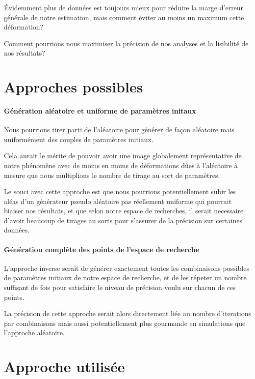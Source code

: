 		Évidemment plus de données est toujours mieux pour réduire la marge d'erreur générale de notre estimation, mais comment éviter au moins un maximum cette déformation?
	
		\begin{problem}
			Comment pourrions nous maximiser la précision de nos analyses et la lisibilité de nos résultats?
		\end{problem}
	
	\section{Approches possibles}
	
		\paragraph{Génération aléatoire et uniforme de paramètres initaux}
		Nous pourrions tirer parti de l'aléatoire pour générer de façon aléatoire mais uniformément des couples de paramètres initiaux.
		
		Cela aurait le mérite de pouvoir avoir une image globalement représentative de notre phénomêne avec de moins en moins de déformations dûes à l'aléatoire à mesure que nous multiplions le nombre de tirage au sort de paramètres.
		
		
		Le souci avec cette approche est que nous pourrions potentiellement subir les aléas d'un générateur pseudo aléatoire pas réellement uniforme qui pourrait biaiser nos résultats, et que selon notre espace de recherches, il serait necessaire d'avoir beaucoup de tirages au sorts pour s'assurer de la précision sur certaines données.
		
		
		\paragraph{Génération complète des points de l'espace de recherche}
		L'approche inverse serait de générer exactement toutes les combinaisons possibles de paramètres initiaux de notre espace de recherche, et de les répeter un nombre suffisant de fois pour satisfaire le niveau de précision voulu sur chacun de ces points.
		
		
		La précision de cette approche serait alors directement liée au nombre d'iterations par combinaisons mais aussi potentiellement plus gourmande en simulations que l'approche aléatoire.
	
	\section{Approche utilisée}
	
